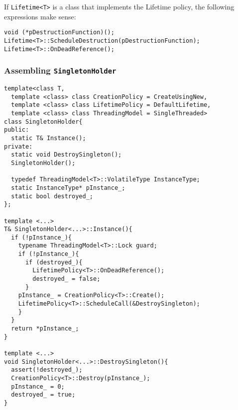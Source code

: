 If \texttt{Lifetime<T>} is a class that implements the Lifetime
policy, the following expressions make sense:
\begin{verbatim}
void (*pDestructionFunction)();
Lifetime<T>::ScheduleDestruction(pDestructionFunction);
Lifetime<T>::OnDeadReference();
\end{verbatim}

\subsubsection{Assembling \texttt{SingletonHolder}}

\begin{verbatim}
template<class T,
  template <class> class CreationPolicy = CreateUsingNew,
  template <class> class LifetimePolicy = DefaultLifetime,
  template <class> class ThreadingModel = SingleThreaded>
class SingletonHolder{
public:
  static T& Instance();
private:
  static void DestroySingleton();
  SingletonHolder();

  typedef ThreadingModel<T>::VolatileType InstanceType;
  static InstanceType* pInstance_;
  static bool destroyed_;
};

template <...>
T& SingletonHolder<...>::Instance(){
  if (!pInstance_){
    typename ThreadingModel<T>::Lock guard;
    if (!pInstance_){
      if (destroyed_){
        LifetimePolicy<T>::OnDeadReference();
        destroyed_ = false;
      }
    pInstance_ = CreationPolicy<T>::Create();
    LifetimePolicy<T>::ScheduleCall(&DestroySingleton);
    }
  }
  return *pInstance_;
}

template <...>
void SingletonHolder<...>::DestroySingleton(){
  assert(!destroyed_);
  CreationPolicy<T>::Destroy(pInstance_);
  pInstance_ = 0;
  destroyed_ = true;
}
\end{verbatim}

